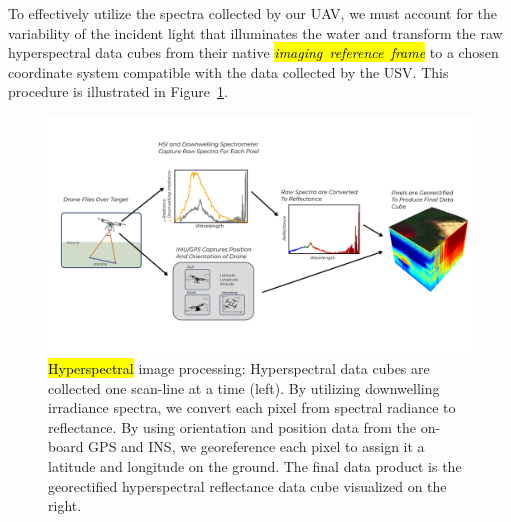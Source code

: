 \documentclass[remotesensing,article,accept,pdftex,moreauthors]{Definitions/mdpi}
\begin{document}
To effectively utilize the spectra collected by our UAV, we must account for the variability of the incident light that illuminates the water and transform the raw hyperspectral data cubes from their native \textit{\hl{imaging~reference~frame}} %
 to a chosen coordinate system compatible with the data collected by the USV. This procedure is illustrated in Figure~\ref{fig:hsi-pipeline}.

\begin{figure}[H]
\vspace{-0.3in}
\hspace{-6pt}\includegraphics[width=14cm]{figures/materials-and-methods/pipeline-figure-2.pdf}
\vspace{-0.4in}
\caption{\hl{Hyperspectral} %
 image processing: Hyperspectral data cubes are collected one scan-line at a time (left). By utilizing downwelling irradiance spectra, we convert each pixel from spectral radiance to reflectance. By using orientation and position data from the on-board GPS and INS, we georeference each pixel to assign it a latitude and longitude on the ground. The final data product is the georectified hyperspectral reflectance data cube visualized on the right. \label{fig:hsi-pipeline}}
\end{figure}  
\end{document}
